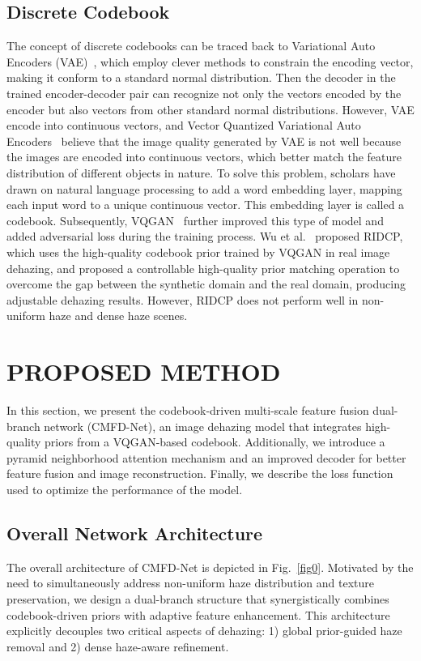 \documentclass[journal]{IEEEtran}
\begin{document}
\subsection{Discrete Codebook}
The concept of discrete codebooks can be traced back to Variational Auto Encoders (VAE)~\cite{kingma2013auto}, which employ clever methods to constrain the encoding vector, making it conform to a standard normal distribution. Then the decoder in the trained encoder-decoder pair can recognize not only the vectors encoded by the encoder but also vectors from other standard normal distributions. However, VAE encode into continuous vectors, and Vector Quantized Variational Auto Encoders~\cite{van2017neural} believe that the image quality generated by VAE is not well because the images are encoded into continuous vectors, which better match the feature distribution of different objects in nature. To solve this problem, scholars have drawn on natural language processing to add a word embedding layer, mapping each input word to a unique continuous vector. This embedding layer is called a codebook. Subsequently, VQGAN~\cite{esser2021taming} further improved this type of model and added adversarial loss during the training process. Wu et al.~\cite{wu2023ridcp} proposed RIDCP, which uses the high-quality codebook prior trained by VQGAN in real image dehazing, and proposed a controllable high-quality prior matching operation to overcome the gap between the synthetic domain and the real domain, producing adjustable dehazing results. However, RIDCP does not perform well in non-uniform haze and dense haze scenes.


\section{PROPOSED METHOD}

In this section, we present the codebook-driven multi-scale feature fusion dual-branch network (CMFD-Net), an image dehazing model that integrates high-quality priors from a VQGAN-based codebook. Additionally, we introduce a pyramid neighborhood attention mechanism and an improved decoder for better feature fusion and image reconstruction. Finally, we describe the loss function used to optimize the performance of the model.

\subsection{Overall Network Architecture}
The overall architecture of CMFD-Net is depicted in Fig.~\ref{fig0}. Motivated by the need to simultaneously address non-uniform haze distribution and texture preservation, we design a dual-branch structure that synergistically combines codebook-driven priors with adaptive feature enhancement. This architecture explicitly decouples two critical aspects of dehazing: 1) global prior-guided haze removal and 2) dense haze-aware refinement.
\end{document}
